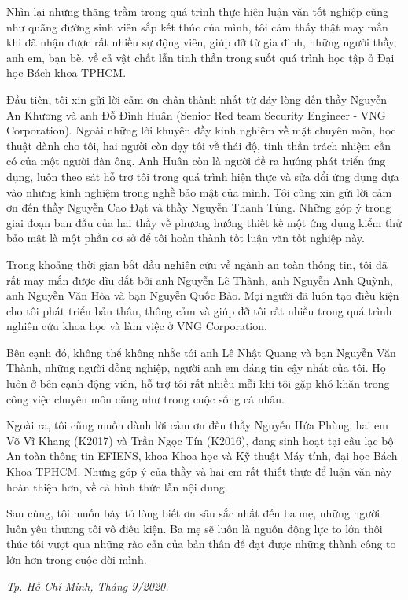 \cleardoublepage
{}
\begin{dedication}
Nhìn lại những thăng trầm trong quá trình thực hiện luận văn tốt nghiệp cũng như quãng đường sinh viên sắp kết thúc của mình, tôi cảm thấy thật may mắn khi đã nhận được rất nhiều sự động viên, giúp đỡ từ gia đình, những người thầy, anh em, bạn bè, về cả vật chất lẫn tinh thần trong suốt quá trình học tập ở Đại học Bách khoa TPHCM.\par
Đầu tiên, tôi xin gửi lời cảm ơn chân thành nhất từ đáy lòng đến thầy Nguyễn An Khương và anh Đỗ Đình Huân (Senior Red team Security Engineer - VNG Corporation). Ngoài những lời khuyên đầy kinh nghiệm về mặt chuyên môn, học thuật dành cho tôi, hai người còn dạy tôi về thái độ, tinh thần trách nhiệm cần có của một người đàn ông. Anh Huân còn là người đề ra hướng phát triển ứng dụng, luôn theo sát hỗ trợ tôi trong quá trình hiện thực và sửa đổi ứng dụng dựa vào những kinh nghiệm trong nghề bảo mật của mình. Tôi cũng xin gửi lời cảm ơn đến thầy Nguyễn Cao Đạt và thầy Nguyễn Thanh Tùng. Những góp ý trong giai đoạn ban đầu của hai thầy về phương hướng thiết kế một ứng dụng kiểm thử bảo mật là một phần cơ sở để tôi hoàn thành tốt luận văn tốt nghiệp này.\par
Trong khoảng thời gian bắt đầu nghiên cứu về ngành an toàn thông tin, tôi đã rất may mắn được dìu dắt bởi anh Nguyễn Lê Thành, anh Nguyễn Anh Quỳnh, anh Nguyễn Văn Hòa và bạn Nguyễn Quốc Bảo. Mọi người đã luôn tạo điều kiện cho tôi phát triển bản thân, thông cảm và giúp đỡ tôi rất nhiều trong quá trình nghiên cứu khoa học và làm việc ở VNG Corporation.\par
Bên cạnh đó, không thể không nhắc tới anh Lê Nhật Quang và bạn Nguyễn Văn Thành, những người đồng nghiệp, người anh em đáng tin cậy nhất của tôi. Họ luôn ở bên cạnh động viên, hỗ trợ tôi rất nhiều mỗi khi tôi gặp khó khăn trong công việc chuyên môn cũng như trong cuộc sống cá nhân.\par
Ngoài ra, tôi cũng muốn dành lời cảm ơn đến thầy Nguyễn Hứa Phùng, hai em Võ Vĩ Khang (K2017) và Trần Ngọc Tín (K2016), đang sinh hoạt tại câu lạc bộ An toàn thông tin EFIENS, khoa Khoa học và Kỹ thuật Máy tính, đại học Bách Khoa TPHCM. Những góp ý của thầy và hai em rất thiết thực để luận văn này hoàn thiện hơn, về cả hình thức lẫn nội dung.\par
Sau cùng, tôi muốn bày tỏ lòng biết ơn sâu sắc nhất đến ba mẹ, những người luôn yêu thương tôi vô điều kiện. Ba mẹ sẽ luôn là nguồn động lực to lớn thôi thúc tôi vượt qua những rào cản của bản thân để đạt được những thành công to lớn hơn trong cuộc đời mình.
\begin{flushright}
    \textit{Tp. Hồ Chí Minh, Tháng 9/2020.}
\end{flushright}
\end{dedication}